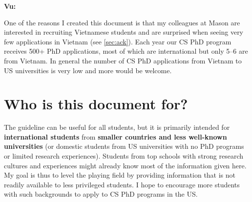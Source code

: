 \documentclass[oneside,11pt,dvipsnames]{book}
\newenvironment{commentbox}[1][]{
  \small
  \begin{mybox}
    {\small \textbf{#1}}
  }{
  \end{mybox}
}
\begin{document}
\begin{commentbox}[Vu:]
  One of the reasons I created this document is that my colleagues at Mason are interested in recruiting Vietnamese students and are surprised when seeing very few applications in Vietnam (see \autoref{sec:ack}). Each year our CS PhD program receives 500+ PhD applications, most of which are international but only 5--6 are from Vietnam. In general the number of CS PhD applications from Vietnam to US universities is very low and more would be welcome.
\end{commentbox}




\section{Who is this document for?}

The guideline can be useful for all students, but it is primarily intended for \textbf{international students} from \textbf{smaller countries and less well-known universities} (or domestic students from US universities with no PhD programs or limited research experiences). 
Students from top schools with strong research cultures and experiences might already know most of the information given here.
My goal is thus to level the playing field by providing information that is not readily available to less privileged students. 
I hope to encourage more students with such backgrounds to apply to CS PhD programs in the US.
\end{document}
